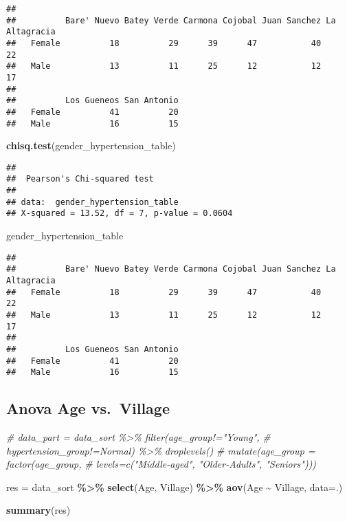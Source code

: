 \documentclass[
]{article}
\newenvironment{Shaded}{\begin{snugshade}}{\end{snugshade}}
\newcommand{\AttributeTok}[1]{\textcolor[rgb]{0.13,0.29,0.53}{#1}}
\newcommand{\CommentTok}[1]{\textcolor[rgb]{0.56,0.35,0.01}{\textit{#1}}}
\newcommand{\FunctionTok}[1]{\textcolor[rgb]{0.13,0.29,0.53}{\textbf{#1}}}
\newcommand{\NormalTok}[1]{#1}
\newcommand{\OtherTok}[1]{\textcolor[rgb]{0.56,0.35,0.01}{#1}}
\newcommand{\SpecialCharTok}[1]{\textcolor[rgb]{0.81,0.36,0.00}{\textbf{#1}}}
\begin{document}
\begin{verbatim}
##         
##          Bare' Nuevo Batey Verde Carmona Cojobal Juan Sanchez La Altagracia
##   Female          18          29      39      47           40            22
##   Male            13          11      25      12           12            17
##         
##          Los Gueneos San Antonio
##   Female          41          20
##   Male            16          15
\end{verbatim}

\begin{Shaded}
\begin{Highlighting}[]
\FunctionTok{chisq.test}\NormalTok{(gender\_hypertension\_table)}
\end{Highlighting}
\end{Shaded}

\begin{verbatim}
## 
##  Pearson's Chi-squared test
## 
## data:  gender_hypertension_table
## X-squared = 13.52, df = 7, p-value = 0.0604
\end{verbatim}

\begin{Shaded}
\begin{Highlighting}[]
\NormalTok{gender\_hypertension\_table }
\end{Highlighting}
\end{Shaded}

\begin{verbatim}
##         
##          Bare' Nuevo Batey Verde Carmona Cojobal Juan Sanchez La Altagracia
##   Female          18          29      39      47           40            22
##   Male            13          11      25      12           12            17
##         
##          Los Gueneos San Antonio
##   Female          41          20
##   Male            16          15
\end{verbatim}

\subsection{Anova Age vs.~Village}\label{anova-age-vs.-village}

\begin{Shaded}
\begin{Highlighting}[]
\CommentTok{\# data\_part = data\_sort \%\textgreater{}\% filter(age\_group!="Young",}
\CommentTok{\#                                  hypertension\_group!=\textquotesingle{}Normal\textquotesingle{}) \%\textgreater{}\% droplevels()}
  \CommentTok{\# mutate(age\_group = factor(age\_group, }
  \CommentTok{\#                                                                                 levels=c("Middle{-}aged", "Older{-}Adults", "Seniors")))}

\NormalTok{res }\OtherTok{=}\NormalTok{ data\_sort }\SpecialCharTok{\%\textgreater{}\%} \FunctionTok{select}\NormalTok{(Age, Village) }\SpecialCharTok{\%\textgreater{}\%}
  \FunctionTok{aov}\NormalTok{(Age }\SpecialCharTok{\textasciitilde{}}\NormalTok{ Village, }\AttributeTok{data=}\NormalTok{.)}

\FunctionTok{summary}\NormalTok{(res)}
\end{Highlighting}
\end{Shaded}
\end{document}
